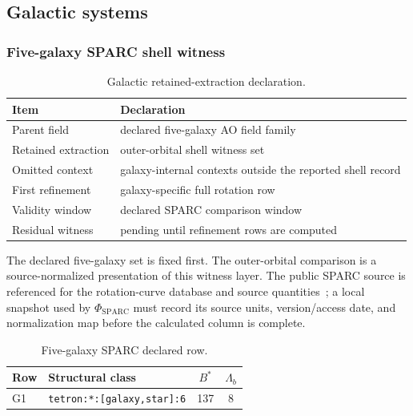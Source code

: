 \subsection{Galactic systems}

\subsubsection{Five-galaxy SPARC shell witness}
\label{man:five-galaxy-sparc-witness}

\begin{table}[H]
\centering
\caption{Galactic retained-extraction declaration.}
\label{tab:galactic-retention}
\begin{threeparttable}
\begin{tabularx}{\linewidth}{@{}lX@{}}
\toprule
Item & Declaration \\
\midrule
Parent field & declared five-galaxy AO field family \\
Retained extraction & outer-orbital shell witness set \\
Omitted context & galaxy-internal contexts outside the reported shell record \\
First refinement & galaxy-specific full rotation row \\
Validity window & declared SPARC comparison window \\
Residual witness & pending until refinement rows are computed \\
\bottomrule
\end{tabularx}
\end{threeparttable}
\end{table}

The declared five-galaxy set is fixed first. The outer-orbital comparison is a source-normalized presentation of this witness layer. The public SPARC source is referenced for the rotation-curve database and source quantities~\cite{sparc_paper,sparc_site}; a local snapshot used by \(\Phi_{\mathrm{SPARC}}\) must record its source units, version/access date, and normalization map before the calculated column is complete.

\begin{table}[H]
\centering
\caption{Five-galaxy SPARC declared row.}
\label{tab:five-galaxy-row}
\begin{threeparttable}
\small
\begin{tabularx}{\linewidth}{@{}lXcc@{}}
\toprule
Row & Structural class & $B^*$ & $\Lambda_b$ \\
\midrule
G1 & \texttt{tetron:*:[galaxy,star]:6} & 137 & 8 \\
\bottomrule
\end{tabularx}
\end{threeparttable}
\end{table}

